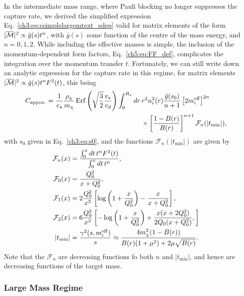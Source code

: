 In the intermediate mass range, where Pauli blocking no longer suppresses the capture rate, we derived the simplified expression Eq.~\ref{ch3:eq:csimplelargemtext_sdep} valid for matrix elements of the form $|\overline{\mathcal M}|^2 \propto \bar{g}(s) t^n$, with $\bar{g}(s)$ some function of the centre of the mass energy, and $n = 0, 1, 2$. While including the effective masses is simple, the inclusion of the momentum-dependent form factors, Eq.~\ref{ch5:eq:FF_def}, complicates the integration over the momentum transfer $t$. Fortunately, we can still write down an analytic expression for the capture rate in this regime, for matrix elements $|\overline{\mathcal M}|^2 \propto \bar{g}(s) t^n F^2(t)$, this being
\begin{equation}
   \begin{split}
      C_\mathrm{appox.} &= \frac{1}{\vstar} \frac{\rho_\chi}{\mchi}\erf\left(\sqrt{\frac{3}{2}}\frac{\vstar}{v_d}\right)\int_0^{\Rstar}dr\,r^2n_i^2(r) \frac{\bar{g}(s_0)}{n+1}\left[2 \mbeff\right]^{2n} \\
      & \hspace{14em}\times\left[\frac{1 - B(r)}{B(r)}\right]^{n+1} \mathcal{F}_n(|t_\mathrm{min}|),
   \end{split}
   \label{ch5:eq:capture_simple}
\end{equation}
with $s_0$ given in Eq.~\ref{ch3:eq:s0}, and the functions $\mathcal{F}_n(|t_\mathrm{min}|)$ are given by
\begin{align}
   \mathcal{F}_n(x) & = \frac{\int_0^x dt\,t^n F^2(t)}{\int_0^x dt\,t^n},\\
   \mathcal{F}_0(x) & = \frac{Q_0^2}{x + Q_0^2},\\
   \mathcal{F}_1(x) & = 2\frac{Q_0^2}{x^2} \left[\log\left(1 + \frac{x}{Q_0^2}\right) - \frac{x}{x + Q_0^2 }\right],\\
   \mathcal{F}_2(x) & = 6 \frac{Q_0^3}{x^3}\left[ -\log\left(1 + \frac{x}{Q_0^2}\right) + \frac{x (x + 2Q_0^2)}{2 Q_0(x + Q_0^2)} ,\right]\\
   |t_\mathrm{min}| & = \frac{\gamma^2(s, m_i^{\rm eff})}{s} \approx\frac{4 m_\chi^2( 1 - B(r))}{B(r)(1 + \mu^2) + 2 \mu\sqrt{B(r)}}.
\end{align}
Note that the $\mathcal{F}_n$ are decreasing functions fo both $n$ and $|t_\mathrm{min}|$, and hence are decreasing functions of the target mass.

\subsubsection{Large Mass Regime}


